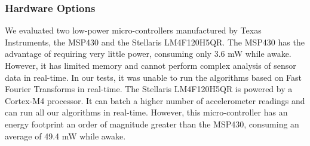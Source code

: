 \iffalse
We implemented three filters of increasing complexity:

  \paragraph{Null} This algorithm performs no filtering.  It simply
  forwards the raw accelerometer readings.


  \paragraph{EMA} Applies an exponential moving average low-pass
  filter that removes some of the noise from the sensor data and is
  computationally cheap, requiring only a few algebraic operations for
  every sensor reading. The filter takes an alpha parameter between 0
  and 1, that controls the ``smoothness'' of the filtered data, and
  implements the following equation: $out_{t} = (1-\alpha) \times
  out_{t-1} + \alpha \times in$

  \paragraph{FFT} Applies a low-pass filter based on Fast Fourier
  transformations~\cite{libbyFootstepDetection} that is more accurate
  at removing noise from the sensor data. However, it is
  computationally expensive. Two parameters can be set for the
  FFT: a window-size and a relative energy threshold value. The
  window size indicates the number of readings that are to be used in
  each discrete Fourier transform. The relative energy threshold value
  controls the amount of energy in the output data. A lower relative
  energy threshold value would result in ``smoother'' output sensor
  values.
\fi

\subsubsection{Hardware Options}

We evaluated two low-power micro-controllers manufactured by Texas
Instruments, the MSP430 and the Stellaris LM4F120H5QR.  The MSP430 has
the advantage of requiring very little power, consuming only 3.6 mW
while awake.  However, it has limited memory and cannot perform complex
analysis of sensor data in real-time.  In our tests, it was unable to
run the algorithms based on Fast Fourier Transforms in real-time.  
The Stellaris LM4F120H5QR is powered by a Cortex-M4 processor.  It can 
batch a higher number of accelerometer
readings and can run all our algorithms in real-time.  However, this
micro-controller has an energy footprint an order of magnitude greater
than the MSP430, consuming an average of 49.4 mW while awake.

